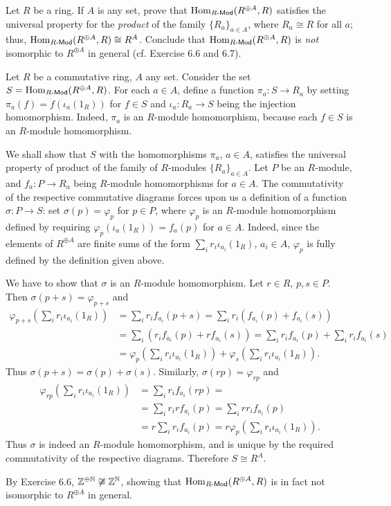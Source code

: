 \begin{problem}
	Let $R$ be a ring. If $A$ is any set, prove that $\mathrm{Hom}_{R\text{-}\mathsf{Mod}}(R^{\oplus A}, R)$ satisfies the universal property for the \emph{product} of the family $\{ R_a \}_{a \in A}$, where $R_a \cong R$ for all $a$; thus, $\mathrm{Hom}_{R\text{-}\mathsf{Mod}}(R^{\oplus A}, R) \cong R^A$. Conclude that $\mathrm{Hom}_{R\text{-}\mathsf{Mod}}(R^{\oplus A}, R)$ is \emph{not} isomorphic to $R^{\oplus A}$ in general (cf. Exercise 6.6 and 6.7).
\end{problem}

\begin{solution}
	Let $R$ be a commutative ring, $A$ any set. Consider the set $S = \mathrm{Hom}_{R\text{-}\mathsf{Mod}}(R^{\oplus A}, R)$. For each $a \in A$, define a function $\pi_a: S \to R_a$ by setting $\pi_a(f) = f(\iota_a(1_R))$ for $f \in S$ and $\iota_a: R_a \to S$ being the injection homomorphism. Indeed, $\pi_a$ is an $R$-module homomorphism, because each $f \in S$ is an $R$-module homomorphism. 
	
	We shall show that $S$ with the homomorphisms $\pi_a$, $a \in A$, satisfies the universal property of product of the family of $R$-modules $\{R_a\}_{a \in A}$. Let $P$ be an $R$-module, and $f_a: P \to R_a$ being $R$-module homomorphisms for $a \in A$. The commutativity of the respective commutative diagrams forces upon us a definition of a function $\sigma: P \to S$: set $\sigma(p) = \varphi_p$ for $p \in P$, where $\varphi_p$ is an $R$-module homomorphism defined by requiring $\varphi_p(\iota_a(1_R)) = f_a(p)$ for $a \in A$. Indeed, since the elements of $R^{\oplus A}$ are finite sums of the form $\sum_{i} r_i \iota_{a_i}(1_R)$, $a_i \in A$, $\varphi_p$ is fully defined by the definition given above.
	
	We have to show that $\sigma$ is an $R$-module homomorphism. Let $r \in R$, $p, s \in P$. Then $\sigma(p + s) = \varphi_{p + s}$ and
	\begin{align*}
		\varphi_{p + s}(\sum_i r_i \iota_{a_i}(1_R)) &= \sum_i r_i f_{a_i}(p + s) = \sum_i r_i (f_{a_i}(p) + f_{a_i}(s)) \\
		&= \sum_i (r_i f_{a_i}(p) + r f_{a_i}(s)) = \sum_i r_i f_{a_i}(p) + \sum_i r_i f_{a_i}(s) \\
		&= \varphi_p(\sum_i r_i \iota_{a_i}(1_R)) + \varphi_s(\sum_i r_i \iota_{a_i}(1_R)) \text{.}
	\end{align*}
	Thus $\sigma(p + s) = \sigma(p) + \sigma(s)$. Similarly, $\sigma(rp) = \varphi_{rp}$ and
	\begin{align*}
		\varphi_{rp}(\sum_i r_i \iota_{a_i}(1_R)) &= \sum_i r_i f_{a_i}(rp) = \\
		&= \sum_i r_i r f_{a_i}(p) = \sum_i r r_i f_{a_i}(p) \\
		&= r \sum_i r_i f_{a_i}(p) = r \varphi_{p}(\sum_i r_i \iota_{a_i}(1_R)) \text{.}
	\end{align*}
	Thus $\sigma$ is indeed an $R$-module homomorphism, and is unique by the required commutativity of the respective diagrams. Therefore $S \cong R^A$.
	
	By Exercise 6.6, $\mathbb{Z}^{\oplus \mathbb{N}} \not \cong \mathbb{Z}^{\mathbb{N}}$, showing that $\mathrm{Hom}_{R\text{-}\mathsf{Mod}}(R^{\oplus A}, R)$ is in fact not isomorphic to $R^{\oplus A}$ in general.
\end{solution}

